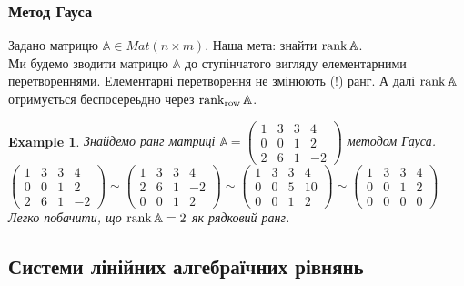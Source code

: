\documentclass[a4paper, 10pt]{article}
\theoremstyle{theoremdd}
\theoremstyle{theoremdd}
\theoremstyle{theoremdd}
\theoremstyle{theoremdd}
\newtheorem{example}[theorem]{Example}
\theoremstyle{theoremdd}
\theoremstyle{theoremdd}
\theoremstyle{theoremdd}
\theoremstyle{theoremdd}
\begin{document}
\subsubsection*{Метод Гауса}
Задано матрицю $\mathbb{A} \in Mat(n \times m)$. Наша мета: знайти $\rank \mathbb{A}$.\\
Ми будемо зводити матрицю $\mathbb{A}$ до ступінчатого вигляду елементарними перетвореннями. Елементарні перетворення не змінюють (!) ранг. А далі $\rank \mathbb{A}$ отримується беспосереьдно через $\rank_{\textrm{row}} \mathbb{A}$.
\begin{example}
Знайдемо ранг матриці $\mathbb{A} = \begin{pmatrix}
1 & 3 & 3 & 4 \\
0 & 0 & 1 & 2 \\
2 & 6 & 1 & -2
\end{pmatrix}$ методом Гауса.\\
$\begin{pmatrix}
1 & 3 & 3 & 4 \\
0 & 0 & 1 & 2 \\
2 & 6 & 1 & -2
\end{pmatrix} \sim \begin{pmatrix}
1 & 3 & 3 & 4 \\
2 & 6 & 1 & -2 \\
0 & 0 & 1 & 2
\end{pmatrix} \sim \begin{pmatrix}
1 & 3 & 3 & 4 \\
0 & 0 & 5 & 10 \\
0 & 0 & 1 & 2
\end{pmatrix} \sim \begin{pmatrix}
1 & 3 & 3 & 4 \\
0 & 0 & 1 & 2 \\
0 & 0 & 0 & 0
\end{pmatrix}$\\
Легко побачити, що $\rank \mathbb{A} = 2$ як рядковий ранг.
\end{example}

\subsection{Системи лінійних алгебраїчних рівнянь}
\end{document}
